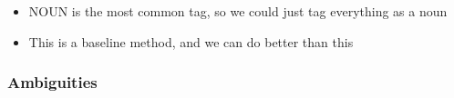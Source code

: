 \documentclass[11pt]{article}
\begin{document}
\begin{minipage}[l]{.5\linewidth}
    \begin{figure}[H]
        \centering
    \end{figure}    
\end{minipage}\hfill
\begin{minipage}[r]{.48\linewidth}
    \begin{itemize}
        \item NOUN is the most common tag, so we could just tag everything as a noun
        \item This is a baseline method, and we can do better than this
    \end{itemize}
\end{minipage}

\subsubsection{Ambiguities}

\begin{figure}[H]
    \centering
\end{figure}
\end{document}
